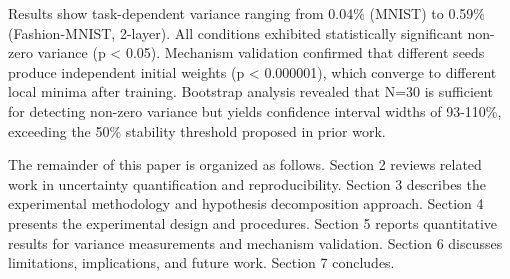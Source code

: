 Results show task-dependent variance ranging from 0.04\% (MNIST) to 0.59\% (Fashion-MNIST, 2-layer). All conditions exhibited statistically significant non-zero variance (p < 0.05). Mechanism validation confirmed that different seeds produce independent initial weights (p < 0.000001), which converge to different local minima after training. Bootstrap analysis revealed that N=30 is sufficient for detecting non-zero variance but yields confidence interval widths of 93-110\%, exceeding the 50\% stability threshold proposed in prior work.

The remainder of this paper is organized as follows. Section 2 reviews related work in uncertainty quantification and reproducibility. Section 3 describes the experimental methodology and hypothesis decomposition approach. Section 4 presents the experimental design and procedures. Section 5 reports quantitative results for variance measurements and mechanism validation. Section 6 discusses limitations, implications, and future work. Section 7 concludes.
